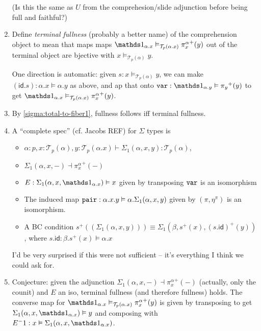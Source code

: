 \documentclass[10pt]{article}
\theoremstyle{definition}
\newcommand{\id}{\mathsf{id}}
\newcommand\TrPlus[2]{\ensuremath{{#1}^+(#2)}}
\newcommand\El[2]{\mathcal{T}_{#1}(#2)}
\begin{document}
\begin{enumerate}
  (Is this the same as $U$ from the comprehesion/slide adjunction before
  being full and faithful?)

\item \label{sigma:full-interesting} Define \emph{terminal fullness}
  (probably a better name) of the comprehension object to mean that maps
  maps $\One_{\alpha.x} \vDash_{\El{p}{\alpha.x}} \TrPlus{\pi^\alpha_x}{y}$
  out of the terminal object are bjective with $x
  \vDash_{\El{p}{\alpha}} y$.

  One direction is automatic: given $s : x \vDash_{\El{p}{\alpha}} y$,
  we can make $(\id.s) : \alpha.x \vDash \alpha.y$ as above, and ap that
  onto $\mtt{var} : \One_{\alpha.y} \vDash \TrPlus{\pi_y}{y}$ to get
  $\One_{\alpha.x} \vDash_{\El{p}{\alpha.x}} \TrPlus{\pi^\alpha_x}{y}$.

\item By \ref{sigma:total-to-fiber1}, fullness follows iff terminal
  fullness.  
  
\item \label{sigma:complete}

  A ``complete spec'' (cf. Jacobs REF) for $\Sigma$ types is
  \begin{itemize}
  \item $\alpha : p, x : \El{p}{\alpha}, y : \El{p}{\alpha.x} \vdash \Sigma_1(\alpha,x,y) : \El{p}{\alpha}$,
  \item $\Sigma_1(\alpha,x,-) \dashv \TrPlus{\pi^\alpha_x}{-}$
  \item $E : \Sigma_1(\alpha,x,\One_{\alpha.x}) \vDash x$ given by
    transposing $\mathtt{var}$ is an isomorphism
  \item The induced map $\mathtt{pair} : \alpha.x.y \vDash
    \alpha.\Sigma_1(\alpha,x,y)$ given by $(\pi, \eta^\pi)$ is an
    isomorphism.
  \item A BC condition $\TrPlus{s}{(\Sigma_1(\alpha,x,y))} \equiv
    \Sigma_1(\beta,\TrPlus{s}{x}, \TrPlus{(s . \id)}{y})$,
    where $s.\id : \beta.\TrPlus{s}{x} \vDash \alpha.x$
  \end{itemize}
  I'd be very surprised if this were not sufficient -- it's everything I
  think we could ask for.

\item Conjecture: given the adjunction $\Sigma_1(\alpha,x,-) \dashv
  \TrPlus{\pi^\alpha_x}{-}$ (actually, only the counit) and $E$ an iso,
  terminal fullness (and therefore fullness) holds.  The converse map
  for $\One_{\alpha.x} \vDash_{\El{p}{\alpha.x}} \TrPlus{\pi^\alpha_x}{y}$
  is given by transposing to get $\Sigma_1(\alpha,x,\One_{\alpha.x}) \vDash
  y$ and composing with $E^-1 : x \vDash
  \Sigma_1(\alpha,x,\One_{\alpha.x})$.


\end{enumerate}
\end{document}

